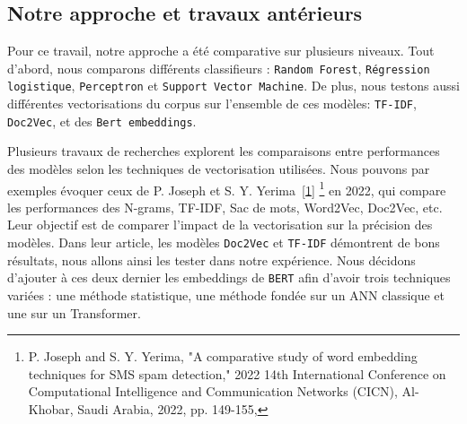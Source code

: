\subsection{Notre approche et travaux antérieurs}

Pour ce travail, notre approche a été comparative sur plusieurs niveaux. Tout d'abord, nous comparons différents classifieurs : \texttt{Random Forest}, \texttt{Régression logistique}, \texttt{Perceptron} et \texttt{Support Vector Machine}. De plus, nous testons aussi différentes vectorisations du corpus sur l'ensemble de ces modèles: \texttt{TF-IDF}, \texttt{Doc2Vec}, et des \texttt{Bert embeddings}.


\par Plusieurs travaux de recherches explorent les comparaisons entre performances des modèles selon les techniques de vectorisation utilisées. Nous pouvons par exemples évoquer ceux de P. Joseph et S. Y. Yerima~\hyperlink{ref1}{[1]} \footnote{P. Joseph and S. Y. Yerima, "A comparative study of word embedding techniques for SMS spam detection," 2022 14th International Conference on Computational Intelligence and Communication Networks (CICN), Al-Khobar, Saudi Arabia, 2022, pp. 149-155,} en 2022, qui compare les performances des N-grams, TF-IDF, Sac de mots, Word2Vec, Doc2Vec, etc. Leur objectif est de comparer l'impact de la vectorisation sur la précision des modèles. Dans leur article, les modèles \texttt{Doc2Vec} et \texttt{TF-IDF} démontrent de bons résultats, nous allons ainsi les tester dans notre expérience. Nous décidons d'ajouter à ces deux dernier les embeddings de \texttt{BERT} afin d'avoir trois techniques variées : une méthode statistique, une méthode fondée sur un ANN classique et une sur un Transformer.
